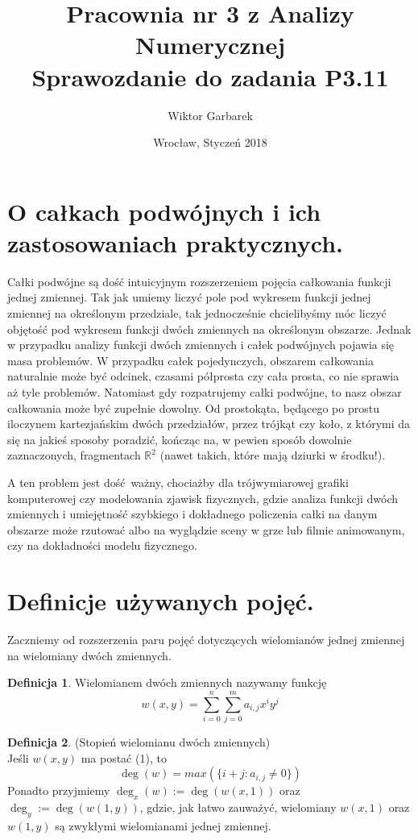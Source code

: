 \documentclass[10pt,wide]{mwart}
\theoremstyle{definition}
\newtheorem{df}{Definicja}
\begin{document}
\title{\textbf{Pracownia nr 3 z Analizy Numerycznej}\\
Sprawozdanie do zadania \textbf{P3.11}}
\author{Wiktor Garbarek}
\date{Wrocław, Styczeń 2018}

\maketitle
 \thispagestyle{empty}
\section{O całkach podwójnych i ich zastosowaniach praktycznych.}
Całki podwójne są dość intuicyjnym rozszerzeniem pojęcia całkowania funkcji jednej zmiennej.
Tak jak umiemy liczyć pole pod wykresem funkcji jednej zmiennej na określonym przedziale,
tak jednocześnie chcielibyśmy móc liczyć objętość pod wykresem funkcji dwóch zmiennych na określonym obszarze.
Jednak w przypadku analizy funkcji dwóch zmiennych i całek podwójnych pojawia się masa problemów.
W przypadku całek pojedynczych, obszarem całkowania naturalnie może być odcinek, czasami półprosta czy cała prosta, co nie sprawia aż tyle problemów.
Natomiast gdy rozpatrujemy całki podwójne, to nasz obszar całkowania może być zupełnie dowolny.
Od prostokąta, będącego po prostu iloczynem kartezjańskim dwóch przedziałów,
przez trójkąt czy koło, z którymi da się na jakieś sposoby poradzić,
kończąc na, w pewien sposób dowolnie zaznaczonych, fragmentach \(\mathbb{R}^2\) (nawet takich, które mają dziurki w środku!).

A ten problem jest dość ważny, chociażby dla trójwymiarowej grafiki komputerowej czy modelowania zjawisk fizycznych,
gdzie analiza funkcji dwóch zmiennych i umiejętność szybkiego i dokładnego policzenia całki na danym obszarze może rzutować
albo na wyglądzie sceny w grze lub filmie animowanym, czy na dokładności modelu fizycznego.


\section{Definicje używanych pojęć.}
Zaczniemy od rozszerzenia paru pojęć dotyczących wielomianów jednej zmiennej na wielomiany dwóch zmiennych.
\begin{df}
  Wielomianem dwóch zmiennych nazywamy funkcję
  \begin{equation}
    w(x,y) = \sum_{i=0}^{n} \sum_{j=0}^{m} a_{i,j}x^iy^j
  \end{equation}
\end{df}
\begin{df}(Stopień wielomianu dwóch zmiennych) \\
Jeśli \(w(x,y)\) ma postać (1), to
\begin{equation*}
  \deg(w) = max(\{i+j : a_{i,j} \neq 0\})
\end{equation*}
Ponadto przyjmiemy \(\deg_x(w) := \deg(w(x,1))\) oraz \(\deg_y := \deg(w(1,y))\), gdzie, jak łatwo zauważyć, wielomiany \(w(x,1)\) oraz \(w(1,y)\) są zwykłymi wielomianami jednej zmiennej.
\end{df}
\end{document}
